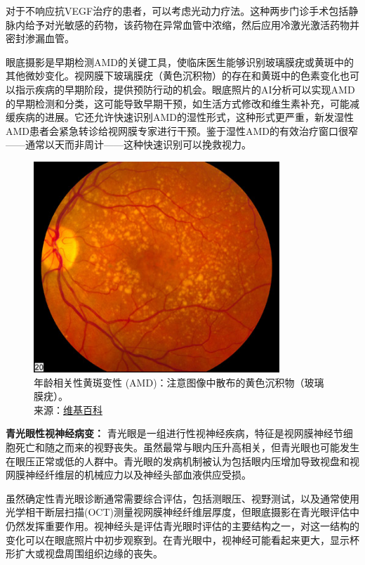 \documentclass[
  Letterpaper,
]{scrbook}
\begin{document}
对于不响应抗VEGF治疗的患者，可以考虑光动力疗法。这种两步门诊手术包括静脉内给予对光敏感的药物，该药物在异常血管中浓缩，然后应用冷激光激活药物并密封渗漏血管。

眼底摄影是早期检测AMD的关键工具，使临床医生能够识别玻璃膜疣或黄斑中的其他微妙变化。视网膜下玻璃膜疣（黄色沉积物）的存在和黄斑中的色素变化也可以指示疾病的早期阶段，提供预防行动的机会。眼底照片的AI分析可以实现AMD的早期检测和分类，这可能导致早期干预，如生活方式修改和维生素补充，可能减缓疾病的进展。它还允许快速识别AMD的湿性形式，这种形式更严重，新发湿性AMD患者会紧急转诊给视网膜专家进行干预。鉴于湿性AMD的有效治疗窗口很窄------通常以天而非周计------这种快速识别可以挽救视力。

\begin{figure}[H]

{\centering \includegraphics[width=3.64583in,height=\textheight,keepaspectratio]{_resources/images/pathologies/Intermediate_age_related_macular_degeneration.jpg}

}

\caption{年龄相关性黄斑变性
(AMD)：注意图像中散布的黄色沉积物（玻璃膜疣）。\\
来源：\href{https://commons.wikimedia.org/wiki/File:Intermediate_age_related_macular_degeneration.jpg}{维基百科}}

\end{figure}%

\textbf{青光眼性视神经病变：}
青光眼是一组进行性视神经疾病，特征是视网膜神经节细胞死亡和随之而来的视野丧失。虽然最常与眼内压升高相关，但青光眼也可能发生在眼压正常或低的人群中。青光眼的发病机制被认为包括眼内压增加导致视盘和视网膜神经纤维层的机械应力以及神经头部血液供应受损。

虽然确定性青光眼诊断通常需要综合评估，包括测眼压、视野测试，以及通常使用光学相干断层扫描(OCT)测量视网膜神经纤维层厚度，但眼底摄影在青光眼评估中仍然发挥重要作用。视神经头是评估青光眼时评估的主要结构之一，对这一结构的变化可以在眼底照片中初步观察到。在青光眼中，视神经可能看起来更大，显示杯形扩大或视盘周围组织边缘的丧失。
\end{document}
